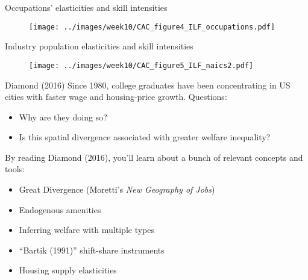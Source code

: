 \documentclass[10pt,notes=hide]{beamer}
\begin{document}
\begin{frame}{Occupations' elasticities and skill intensities\label{OccupationsElasticitiesScatter}}
\begin{figure}
\texttt{[image: ../images/week10/CAC\_figure4\_ILF\_occupations.pdf]}
\end{figure}
\begin{center}
\par\end{center}
\end{frame}
\begin{frame}{Industry population elasticities and skill intensities\label{IndustriesElasticitiesScatter}}
\begin{figure}
\texttt{[image: ../images/week10/CAC\_figure5\_ILF\_naics2.pdf]}
\end{figure}
\begin{center}
\par\end{center}
\end{frame}
\begin{frame}{Diamond (2016)}
Since 1980, college graduates have been concentrating in US cities with faster wage and housing-price growth. Questions:
\begin{itemize}
	\item Why are they doing so?
	\item Is this spatial divergence associated with greater welfare inequality?
\end{itemize}
By reading Diamond (2016), you'll learn about a bunch of relevant concepts and tools:
\begin{itemize}
	\item Great Divergence (Moretti's \textit{New Geography of Jobs})
	\item Endogenous amenities
	\item Inferring welfare with multiple types
	\item ``Bartik (1991)'' shift-share instruments
	\item Housing supply elasticities
\end{itemize}
\end{frame}
\end{document}
